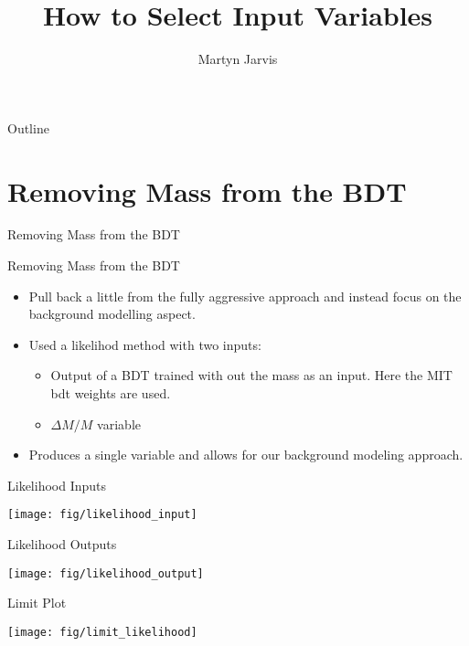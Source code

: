 \documentclass[t, 8pt]{beamer}
\author{Martyn Jarvis}
\title[Input Variables]{How to Select Input Variables}
\begin{document}

\begin{frame}{Outline}
  \tableofcontents
\end{frame}

\section{Removing Mass from the BDT}
\begin{frame}{Removing Mass from the BDT}
\end{frame}

\begin{frame}{Removing Mass from the BDT}
  \begin{itemize}  
  \item Pull back a little from the fully aggressive approach and instead focus on the background modelling aspect.
  \item Used a likelihod method with two inputs:
  \begin{itemize}  
    \item Output of a BDT trained with out the mass as an input. Here the MIT
    bdt weights are used.
    \item $\Delta M/M$ variable
  \end{itemize}
  \item Produces a single variable and allows for our background modeling approach.
  \end{itemize}
\end{frame}

\begin{frame}{Likelihood Inputs}
\begin{center}
    \texttt{[image: fig/likelihood\_input]}
\end{center}
\end{frame}

\begin{frame}{Likelihood Outputs}
\begin{center}
    \texttt{[image: fig/likelihood\_output]}
\end{center}
\end{frame}

\begin{frame}{Limit Plot}
\begin{center}
    \texttt{[image: fig/limit\_likelihood]}
\end{center}
\end{frame}
\end{document}
